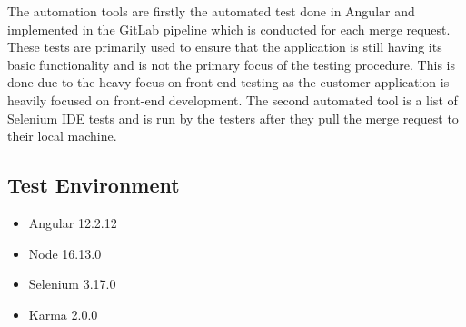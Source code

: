 \noindent The automation tools are firstly the automated test done in Angular and implemented in the GitLab pipeline which is conducted for each merge request. These tests are primarily used to ensure that the application is still having its basic functionality and is not the primary focus of the testing procedure. This is done due to the heavy focus on front-end testing as the customer application is heavily focused on front-end development. The second automated tool is a list of Selenium IDE tests and is run by the testers after they pull the merge request to their local machine.


\subsection{Test Environment}
\begin{itemize}
  \item Angular 12.2.12
  \item Node 16.13.0
  \item Selenium 3.17.0
  \item Karma 2.0.0
  
\end{itemize}
